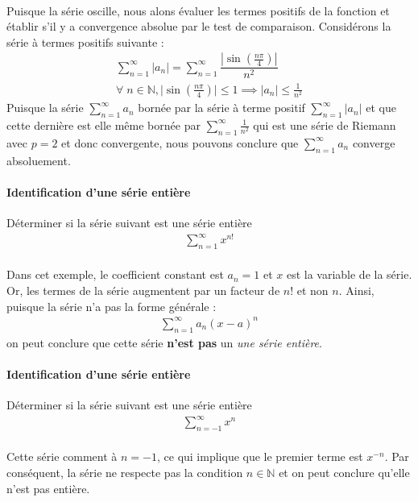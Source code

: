 \documentclass{report}
\begin{document}
\begin{multicols*}{2}
  \mbox{}\\ 
  Puisque la série oscille, nous alons évaluer les 
  termes positifs 
  de la fonction 
  et établir s'il y a convergence absolue par le test de 
  comparaison. Considérons 
  la série à termes positifs suivante : 
  \begin{align*}
      \sum_{n=1}^{\infty }|a_n| =  
      \sum_{n=1}^{\infty }\dfrac{|\sin \left(\frac{n\pi}{4}\right)|}{n^2} 
      \\ 
      \forall \; n \in \mathbb{N}, \big|\sin\left(\frac{n\pi}{4} \right)\big| \leq 1 
      \implies 
      |a_n| \leq \frac{1}{n^2}   
  \end{align*}    
  Puisque la série $\sum_{n=1}^{\infty }a_n$ bornée par 
  la série à terme positif $\sum_{n=1}^{\infty }|a_n|$ et que cette dernière 
  est elle même bornée par $\sum_{n=1}^{\infty }\frac{1}{n^2}$ qui est une 
  série de Riemann avec $p = 2$ et donc convergente, nous pouvons 
  conclure que $\sum_{n=1}^{\infty }a_n$ converge absoluement. 

  \paragraph{Identification d'une série entière}
      Déterminer si la série suivant est une série entière
      \begin{align*}
          \sum_{n=1}^{\infty }x^{n!}
      \end{align*}        
  \mbox{}\\ 
  Dans cet exemple, le coefficient constant est 
  $a_n = 1$ et $x$ est la variable de la série. Or, les termes de la série 
  augmentent par un facteur de $n!$ et non $n$. Ainsi, puisque la série 
  n'a pas la forme générale : 
  \begin{align*}
      \sum_{n=1}^{\infty }a_n(x-a)^n 
  \end{align*}
  on peut conclure que cette série \textbf{n'est pas} un 
  \textit{une série entière}.


  \paragraph{Identification d'une série entière}
      Déterminer si la série suivant est une série entière
      \begin{align*}
          \sum_{n=-1}^{\infty }x^{n} 
      \end{align*}        
  \mbox{}\\ 
  Cette série comment à $n = -1$, ce qui implique que le premier terme est 
  $x^{-n}$. Par conséquent, la série ne respecte pas la condition 
  $n \in \mathbb{N}$ et on peut conclure qu'elle n'est pas entière. 



\end{multicols*}
\end{document}
